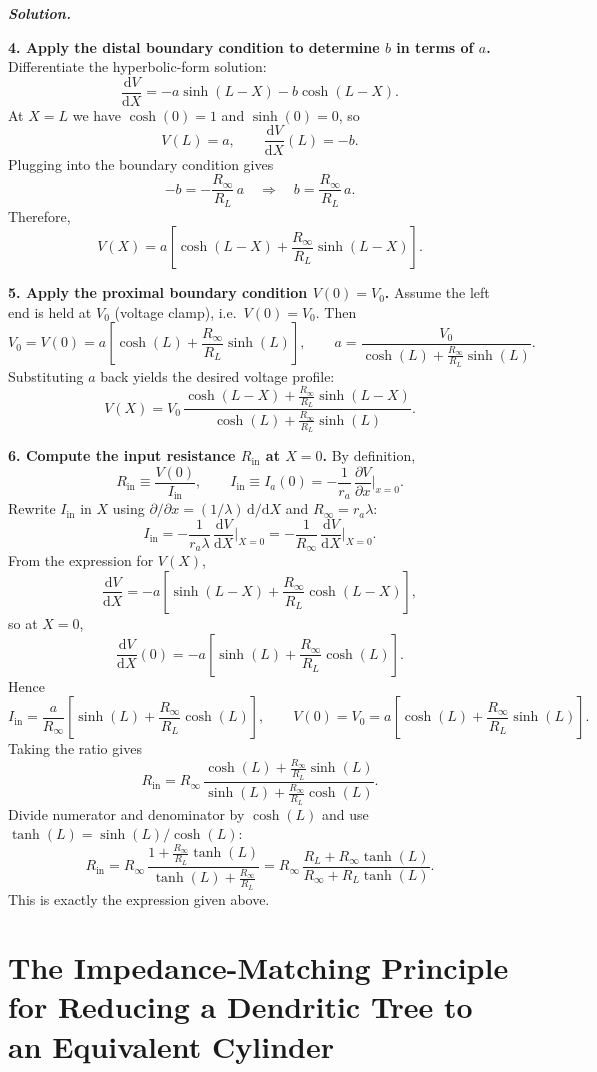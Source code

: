\documentclass{article}
\newif\ifsolutionclearpage
\newenvironment{solution}{%
    \ifsolutionclearpage\clearpage\fi
    \global\solutionclearpagetrue
    \par\noindent\begin{solutionbox}\textbf{\textit{Solution.}}\par\medskip\itshape
}{%
    \end{solutionbox}
}
\begin{document}
\begin{solution}
\medskip
\textbf{4. Apply the distal boundary condition to determine $b$ in terms of $a$.}
Differentiate the hyperbolic-form solution:
\[
\frac{\mathrm{d}V}{\mathrm{d}X}=-a\sinh(L-X)-b\cosh(L-X).
\]
At $X=L$ we have $\cosh(0)=1$ and $\sinh(0)=0$, so
\[
V(L)=a,\qquad \frac{\mathrm{d}V}{\mathrm{d}X}(L)=-b.
\]
Plugging into the boundary condition gives
\[
-b=-\frac{R_{\infty}}{R_L}\,a\quad\Longrightarrow\quad b=\frac{R_{\infty}}{R_L}\,a.
\]
Therefore,
\[
V(X)=a\left[\cosh(L-X)+\frac{R_{\infty}}{R_L}\sinh(L-X)\right].
\]

\medskip
\textbf{5. Apply the proximal boundary condition $V(0)=V_0$.}
Assume the left end is held at $V_0$ (voltage clamp), i.e.\ $V(0)=V_0$.
Then
\[
V_0=V(0)=a\left[\cosh(L)+\frac{R_{\infty}}{R_L}\sinh(L)\right],
\qquad
a=\frac{V_0}{\cosh(L)+\frac{R_{\infty}}{R_L}\sinh(L)}.
\]
Substituting $a$ back yields the desired voltage profile:
\[
V(X)=V_0\,\frac{\cosh(L-X)+\frac{R_{\infty}}{R_L}\sinh(L-X)}{\cosh(L)+\frac{R_{\infty}}{R_L}\sinh(L)}.
\]

\medskip
\textbf{6. Compute the input resistance $R_{\mathrm{in}}$ at $X=0$.}
By definition,
\[
R_{\mathrm{in}}\equiv\frac{V(0)}{I_{\mathrm{in}}},
\qquad
I_{\mathrm{in}}\equiv I_a(0)= -\frac{1}{r_a}\,\frac{\partial V}{\partial x}\bigg|_{x=0}.
\]
Rewrite $I_{\mathrm{in}}$ in $X$ using $\partial/\partial x=(1/\lambda)\,\mathrm{d}/\mathrm{d}X$ and $R_{\infty}=r_a\lambda$:
\[
I_{\mathrm{in}}=-\frac{1}{r_a\lambda}\,\frac{\mathrm{d}V}{\mathrm{d}X}\bigg|_{X=0}
=-\frac{1}{R_{\infty}}\,\frac{\mathrm{d}V}{\mathrm{d}X}\bigg|_{X=0}.
\]
From the expression for $V(X)$,
\[
\frac{\mathrm{d}V}{\mathrm{d}X}=-a\left[\sinh(L-X)+\frac{R_{\infty}}{R_L}\cosh(L-X)\right],
\]
so at $X=0$,
\[
\frac{\mathrm{d}V}{\mathrm{d}X}(0)=-a\left[\sinh(L)+\frac{R_{\infty}}{R_L}\cosh(L)\right].
\]
Hence
\[
I_{\mathrm{in}}=
\frac{a}{R_{\infty}}\left[\sinh(L)+\frac{R_{\infty}}{R_L}\cosh(L)\right],
\qquad
V(0)=V_0=a\left[\cosh(L)+\frac{R_{\infty}}{R_L}\sinh(L)\right].
\]
Taking the ratio gives
\[
R_{\mathrm{in}}
=R_{\infty}\,\frac{\cosh(L)+\frac{R_{\infty}}{R_L}\sinh(L)}{\sinh(L)+\frac{R_{\infty}}{R_L}\cosh(L)}.
\]
Divide numerator and denominator by $\cosh(L)$ and use $\tanh(L)=\sinh(L)/\cosh(L)$:
\[
R_{\mathrm{in}}
=R_{\infty}\,\frac{1+\frac{R_{\infty}}{R_L}\tanh(L)}{\tanh(L)+\frac{R_{\infty}}{R_L}}
=R_{\infty}\,\frac{R_L+R_{\infty}\tanh(L)}{R_{\infty}+R_L\tanh(L)}.
\]
This is exactly the expression given above.
\end{solution}

\clearpage
\section{The Impedance-Matching Principle for Reducing a Dendritic Tree to an Equivalent Cylinder}
\end{document}
